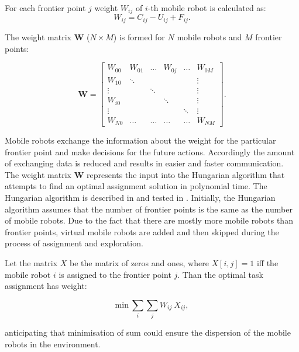 \documentclass[letterpaper, 10 pt, conference]{ieeeconf}  %
\begin{document}
For each frontier point $j$ weight $W_{ij}$ of $i$-th mobile robot is calculated as: 
\begin{equation}
   {W}_{ij}= {C_{ij}} - {U_{ij}} + {F_{ij}}.
   \label{weight}
\end{equation}

The weight matrix $\boldsymbol{W}$ ($N\times M$) is formed for $N$ mobile robots and $M$ frontier points: 

\begin{equation}
    \boldsymbol{W} = \begin{bmatrix}
    W_{00} & W_{01} & \hdots & W_{0j} & \hdots & W_{0M}\\
    W_{10} & \ddots & & & & \vdots\\
    \vdots & & \ddots & & &  \vdots \\
    W_{i0} & & & \ddots & & \vdots \\
    \vdots & & & & \ddots & \vdots\\
    W_{N0} & \hdots  & \hdots  & \hdots  & \hdots &    W_{NM}
    \end{bmatrix}.
\end{equation}

Mobile robots exchange the information about the weight for the particular frontier point and make decisions for the future actions. Accordingly the amount of exchanging data is reduced and results in easier and faster communication.
The weight matrix $\boldsymbol{W}$ represents the input into the Hungarian algorithm that attempts to find an optimal assignment solution in polynomial time. The Hungarian algorithm is described in \cite{hungarian} and tested in \cite{comparison}. Initially, the Hungarian algorithm assumes that the number of frontier points is the same as the number of mobile robots. Due to the fact that there are mostly more mobile robots than frontier points, virtual mobile robots are added and then skipped during the process of assignment and exploration.

Let the matrix $X$ be the matrix of zeros and ones, where $X[i,j]=1$ iff the mobile robot $i$ is assigned to the frontier point $j$.
Than the optimal task assignment has weight:

\begin{equation}
     {\mathrm{min}}\ \sum_{i} \sum_{j} W_{ij}\ X_{ij},
\end{equation}

anticipating that minimisation of sum could ensure the dispersion of the mobile robots in the environment. 
\end{document}
